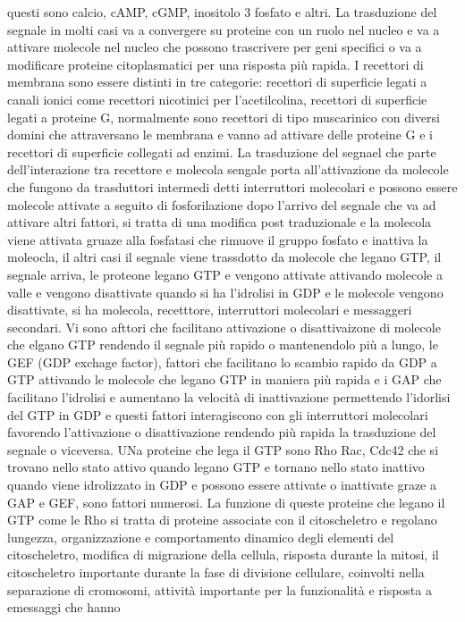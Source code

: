 questi sono calcio, cAMP, cGMP, inositolo 3 fosfato e altri. La trasduzione del segnale in molti casi va a convergere su proteine con un ruolo nel nucleo e va a attivare molecole nel
nucleo che possono trascrivere per geni specifici o va a modificare proteine citoplasmatici per una risposta pi\`u rapida. I recettori di membrana sono essere distinti in tre categorie:
recettori di superficie legati a canali ionici come recettori nicotinici per l'acetilcolina, recettori di superficie legati a proteine G, normalmente sono recettori di tipo muscarinico 
con diversi domini che attraversano le membrana e vanno ad attivare delle proteine G e i recettori di superficie collegati ad enzimi. La trasduzione del segnael che parte dell'interazione
tra recettore e molecola sengale porta all'attivazione da molecole che fungono da trasduttori intermedi detti interruttori molecolari e possono essere molecole attivate a seguito di 
fosforilazione dopo l'arrivo del segnale che va ad attivare altri fattori, si tratta di una modifica post traduzionale e la molecola viene attivata gruaze alla fosfatasi che rimuove il 
gruppo fosfato e inattiva la moleocla, il altri casi il segnale viene trassdotto da molecole che legano GTP, il segnale arriva, le proteone legano GTP e vengono attivate attivando 
molecole a valle e vengono disattivate quando si ha l'idrolisi in GDP e le molecole vengono disattivate, si ha molecola, recetttore, interruttori molecolari e messaggeri secondari. Vi
sono afttori che facilitano attivazione o disattivaizone di molecole che elgano GTP rendendo il segnale pi\`u rapido o mantenendolo pi\`u a lungo, le GEF (GDP exchage factor), fattori 
che facilitano lo scambio rapido da GDP a GTP attivando le molecole che legano GTP in maniera pi\`u rapida e i GAP che facilitano l'idrolisi e aumentano la velocit\`a di inattivazione 
permettendo l'idorlisi del GTP in GDP e questi fattori interagiscono con gli interruttori molecolari favorendo l'attivazione o disattivazione rendendo pi\`u rapida la trasduzione del 
segnale o viceversa. UNa proteine che lega il GTP sono Rho Rac, Cdc42 che si trovano nello stato attivo quando legano GTP e tornano nello stato inattivo quando viene idrolizzato in GDP
e possono essere attivate o inattivate graze a GAP e GEF, sono fattori numerosi. La funzione di queste proteine che legano il GTP come le Rho si tratta di proteine associate con il 
citoscheletro e regolano lungezza, organizzazione e comportamento dinamico degli elementi del citoscheletro, modifica di migrazione della cellula, risposta durante la mitosi, il 
citoscheletro importante durante la fase di divisione cellulare, coinvolti nella separazione di cromosomi, attivit\`a importante per la funzionalit\`a e risposta a emessaggi che hanno
